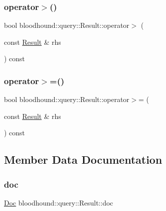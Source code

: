 \subsubsection{\texorpdfstring{operator$>$()}{operator>()}}
{\footnotesize\ttfamily bool bloodhound\+::query\+::\+Result\+::operator$>$ (\begin{DoxyParamCaption}\item[{const \mbox{\hyperlink{structbloodhound_1_1query_1_1Result}{Result}} \&}]{rhs }\end{DoxyParamCaption}) const\hspace{0.3cm}{\ttfamily [inline]}}

\mbox{\label{structbloodhound_1_1query_1_1Result_a5af24f990ab7687d25e25b1f66dfb8a3}} 
\subsubsection{\texorpdfstring{operator$>$=()}{operator>=()}}
{\footnotesize\ttfamily bool bloodhound\+::query\+::\+Result\+::operator$>$= (\begin{DoxyParamCaption}\item[{const \mbox{\hyperlink{structbloodhound_1_1query_1_1Result}{Result}} \&}]{rhs }\end{DoxyParamCaption}) const\hspace{0.3cm}{\ttfamily [inline]}}



\subsection{Member Data Documentation}
\mbox{\label{structbloodhound_1_1query_1_1Result_a5f6acbb120aaf435333e410c0595962a}} 
\subsubsection{\texorpdfstring{doc}{doc}}
{\footnotesize\ttfamily \mbox{\hyperlink{structbloodhound_1_1Doc}{Doc}} bloodhound\+::query\+::\+Result\+::doc}

